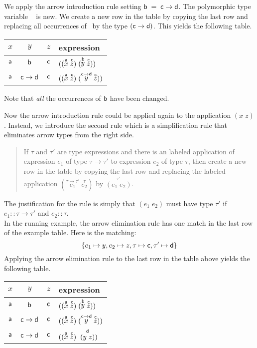\documentclass[11pt]{article}
\begin{document}
We apply the arrow introduction rule setting
${\sf{b}}\;=\;{\sf{c}}\rightarrow{\sf{d}}$. The polymorphic type variable \sfd~ is new. We
create a new row in the table by copying the last row and replacing all
occurrences of \sfb~by the type $({\sf{c}}\rightarrow{\sf{d}})$.  This yields the
following table.

\begin{center}
\begin{tabular}{ccc|l}
$x$ & $y$ & $z$ & expression \\\hline{}
${\sf{a}}$ & ${\sf{b}}$ & ${\sf{c}}$ & $((\stackrel{{\sf{a}}}{x} \; \stackrel{{\sf{c}}}{z})\; (\stackrel{{\sf{b}}}{y} \; \stackrel{{\sf{c}}}{z}))$ \\
${\sf{a}}$ & ${\sf{c}}\rightarrow{}{\sf{d}}$ & ${\sf{c}}$ &$((\stackrel{{\sf{a}}}{x} \; \stackrel{{\sf{c}}}{z})\; (\stackrel{{\sf{c}}\rightarrow{}{\sf{d}}}{y} \; \stackrel{{\sf{c}}}{z}))$ \\
\end{tabular}
\end{center}
Note that {\em{all}} the occurrences of ${\sf{b}}$ have been changed.

Now the arrow introduction rule could be applied again to the application
$(x\;z)$.  Instead, we introduce the second rule which is a simplification rule
that eliminates arrow types from the right side.

\begin{quotation}
 If $\tau$ and $\tau'$ are type
expressions and there is an labeled application of expression $e_1$ of type
$\tau\rightarrow\tau'$ to expression $e_2$ of type $\tau$, then create a new
row in the table by copying the last row and replacing the labeled application
$(\stackrel{\tau\rightarrow\tau'}{e_1}\;\stackrel{\tau}{e_2})$ by
$\stackrel{\tau'}{(e_1\;e_2)}$.
\end{quotation}

\noindent{}The justification for the rule is simply that $(e_1\;e_2)$ must have type
$\tau'$ if $e_1::\tau\rightarrow\tau'$ and $e_2::\tau$.\\

In the running example, the arrow elimination rule has one match in the last
row of the example table.  Here is the matching:
\[\{e_1\mapsto{}y,e_2\mapsto{}z,\tau\mapsto{}{\sf{c}},\tau'\mapsto{\sf{d}}\}\]
Applying the arrow elimination rule to the last row in the table above yields
the following table.

\begin{center}
\begin{tabular}{ccc|l}
$x$ & $y$ & $z$ & expression \\\hline{}
${\sf{a}}$ & ${\sf{b}}$ & ${\sf{c}}$ &$((\stackrel{{\sf{a}}}{x} \; \stackrel{{\sf{c}}}{z})\; (\stackrel{{\sf{b}}}{y} \; \stackrel{{\sf{c}}}{z}))$ \\
${\sf{a}}$ & ${\sf{c}}\rightarrow{}{\sf{d}}$ & ${\sf{c}}$ &$((\stackrel{{\sf{a}}}{x} \; \stackrel{{\sf{c}}}{z})\; (\stackrel{{\sf{c}}\rightarrow{}{\sf{d}}}{y} \; \stackrel{{\sf{c}}}{z}))$ \\
${\sf{a}}$ & ${\sf{c}}\rightarrow{}{\sf{d}}$ & ${\sf{c}}$ & $((\stackrel{{\sf{a}}}{x} \; \stackrel{{\sf{c}}}{z})\; \stackrel{{\sf{d}}}{(y\;z)})$ \\
\end{tabular}
\end{center}
\end{document}
